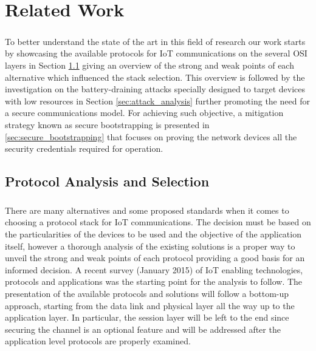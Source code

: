 
\chapter{Related Work}
\label{chapter:related_work}

\paragraph{}
To better understand the state of the art in this field of research our work starts by showcasing the available protocols for \gls{IoT} communications on the several \gls{OSI} layers in Section \ref{sec:protocol_analysis} giving an overview of the strong and weak points of each alternative which influenced the stack selection. This overview is followed by the investigation on the battery-draining attacks specially designed to target devices with low resources in Section \ref{sec:attack_analysis} further promoting the need for a secure communications model. For achieving such objective, a mitigation strategy known as secure bootstrapping is presented in \ref{sec:secure_bootstrapping} that focuses on proving the network devices all the security credentials required for operation.

\section{Protocol Analysis and Selection}
\label{sec:protocol_analysis}

\paragraph{}
There are many alternatives and some proposed standards when it comes to choosing a protocol stack for \gls{IoT} communications. The decision must be based on the particularities of the devices to be used and the objective of the application itself, however a thorough analysis of the existing solutions is a proper way to unveil the strong and weak points of each protocol providing a good basis for an informed decision. A recent survey (January 2015) \cite{Al-Fuqaha2015} of \gls{IoT} enabling technologies, protocols and applications was the starting point for the analysis to follow. The presentation of the available protocols and solutions will follow a bottom-up approach, starting from the data link and physical layer all the way up to the application layer. In particular, the session layer will be left to the end since securing the channel is an optional feature and will be addressed after the application level protocols are properly examined.


